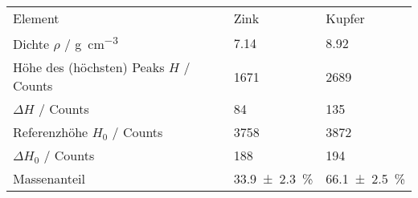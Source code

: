 \begin{tabular}{p{6cm}|ll}
\toprule

Element 										& {Zink}	& {Kupfer} 	\\
Dichte $\rho$ / \si{\gram\per\cubic\centi\metre}& \num{7.14}& \num{8.92}\\
Höhe des (höchsten) Peaks $H$ / Counts			& 1671 		& 2689		\\
$\Delta H$ / Counts								& 84		& 135		\\
Referenzhöhe $H_0$ / Counts 					& 3758		& 3872		\\
$\Delta H_0$ / Counts							& 188		& 194		\\
Massenanteil									& {\SI{33,9+-2,3}{\percent}}&{\SI{66,1+-2,5}{\percent}}\\

\bottomrule
\end{tabular}